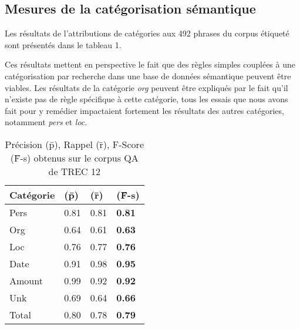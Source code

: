 \documentclass[10pt,a4paper]{article}
\begin{document}

\subsection{Mesures de la catégorisation sémantique}\label{evaluation}

\par Les résultats de l'attributions de catégories aux 492 phrases du corpus étiqueté sont présentés dans le tableau 1. 
\par Ces résultats mettent en perspective le fait que des règles simples couplées à une catégorisation par recherche dans une base de données sémantique peuvent être viables. Les résultats de la catégorie \emph{org} peuvent être expliqués par le fait qu'il n'existe pas de règle spécifique à cette catégorie, tous les essais que nous avons fait pour y remédier impactaient fortement les résultats des autres catégories, notamment \emph{pers} et \emph{loc}.

\begin{table}[h]
    \begin{center}
        \begin{tabular}{|p{2.5cm}|l|l|l|}
            \hline
            Catégorie & (\={p}) & (\={r}) & (\={F}-s) \\
            \hline
            Pers & 0.81 & 0.81 & \textbf{0.81} \\
            \hline
            Org & 0.64 & 0.61 & \textbf{0.63} \\
            \hline
            Loc & 0.76 & 0.77 & \textbf{0.76} \\
            \hline
            Date & 0.91 & 0.98 & \textbf{0.95} \\
            \hline
            Amount & 0.99 & 0.92 & \textbf{0.92} \\
            \hline
            Unk & 0.69 & 0.64 & \textbf{0.66} \\
            \hline
            \hline
            Total & 0.80 & 0.78 & \textbf{0.79} \\
            \hline
        \end{tabular}
        \caption{\label{tab:results}Précision (\={p}), Rappel (\={r}), F-Score (\={F}-s) obtenus sur le corpus QA de TREC 12}
    \end{center}
\end{table}
\end{document}
